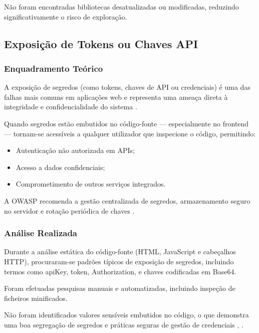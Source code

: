 Não foram encontradas bibliotecas desatualizadas ou modificadas, reduzindo significativamente o risco de exploração.

\subsection{Exposição de Tokens ou Chaves API}

\subsubsection{Enquadramento Teórico}

A exposição de segredos (como tokens, chaves de API ou credenciais) é uma das falhas mais comuns em aplicações web e representa uma ameaça direta à integridade e confidencialidade do sistema \cite{ref12}.

Quando segredos estão embutidos no código-fonte — especialmente no frontend — tornam-se acessíveis a qualquer utilizador que inspecione o código, permitindo:

\begin{itemize}

\item Autenticação não autorizada em APIs;

\item Acesso a dados confidenciais;

\item Comprometimento de outros serviços integrados.

\end{itemize}

A OWASP recomenda a gestão centralizada de segredos, armazenamento seguro no servidor e rotação periódica de chaves \cite{ref13}.

\subsubsection{Análise Realizada}

Durante a análise estática do código-fonte (HTML, JavaScript e cabeçalhos HTTP), procuraram-se padrões típicos de exposição de segredos, incluindo termos como apiKey, token, Authorization, e chaves codificadas em Base64.

Foram efetuadas pesquisas manuais e automatizadas, incluindo inspeção de ficheiros minificados.

Não foram identificados valores sensíveis embutidos no código, o que demonstra uma boa segregação de segredos e práticas seguras de gestão de credenciais \cite{ref14}, \cite{ref15}.

